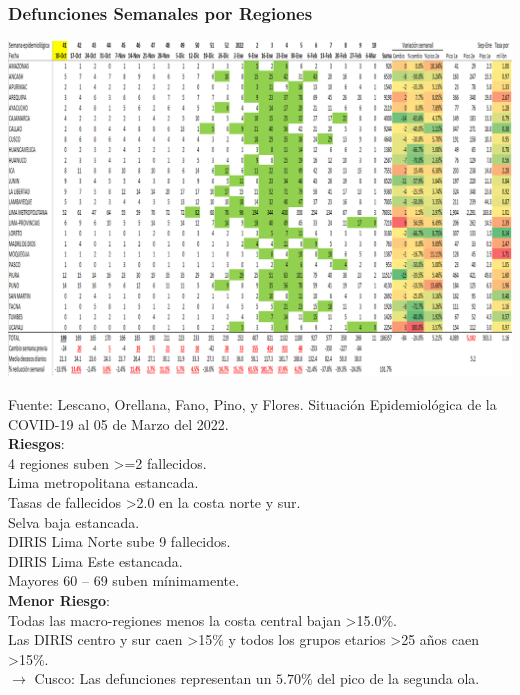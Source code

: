 \documentclass[xcolor=table]{beamer}
\begin{document}
\begin{frame}
	\frametitle{Defunciones Semanales por Regiones}
\vspace{-.2cm}
\begin{center}
	\includegraphics[width=0.55\linewidth]{../sala_nacional/defunciones_regional.png}
\end{center}
{\tiny Fuente: Lescano, Orellana, Fano, Pino, y Flores. Situación Epidemiológica de la COVID-19 al 05 de Marzo del 2022.\\
\textbf{Riesgos}:\\
			4 regiones suben >=2 fallecidos. \\
			Lima metropolitana estancada. \\
			Tasas de fallecidos >2.0 en la costa norte y sur. \\
			Selva baja estancada. \\
			DIRIS Lima Norte sube 9 fallecidos. \\
			DIRIS Lima Este estancada. \\
			Mayores 60 – 69 suben mínimamente. \\
\textbf{Menor Riesgo}: \\
			Todas las macro-regiones menos la costa central bajan >15.0\%. \\
			Las DIRIS centro y sur caen >15\% y todos los grupos etarios >25 años caen >15\%. \\
			}
\vspace{0.01cm}
$\rightarrow$ {\color{mycolor5}Cusco}: Las defunciones representan un $5.70\% $ del pico de la segunda ola.\\
\end{frame}
	
\end{document}
